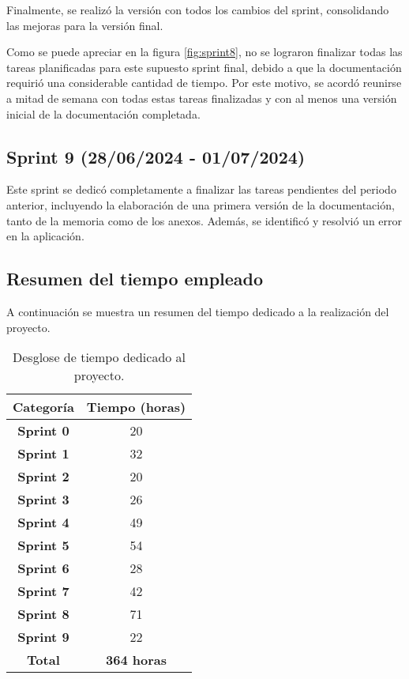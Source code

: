 Finalmente, se realizó la versión con todos los cambios del sprint, consolidando las mejoras para la versión final.


Como se puede apreciar en la figura \ref{fig:sprint8}, no se lograron finalizar todas las tareas planificadas para este supuesto sprint final, debido a que la documentación requirió una considerable cantidad de tiempo. Por este motivo, se acordó reunirse a mitad de semana con todas estas tareas finalizadas y con al menos una versión inicial de la documentación completada.

\subsection{Sprint 9 (28/06/2024 - 01/07/2024)}\label{sprint-9}

Este sprint se dedicó completamente a finalizar las tareas pendientes del periodo anterior, incluyendo la elaboración de una primera versión de la documentación, tanto de la memoria como de los anexos. Además, se identificó y resolvió un error en la aplicación.

\subsection{Resumen del tiempo empleado}\label{resumen-del-tiempo-empleado}

A continuación se muestra un resumen del tiempo dedicado a la realización del proyecto.

\begin{table}[h!]
    \centering
    \begin{tabular}{c c}
        \hline
        \textbf{Categoría}      & \textbf{Tiempo (horas)} \\
        \hline
        \textbf{Sprint 0}       & 20    \\
        \textbf{Sprint 1}       & 32    \\
        \textbf{Sprint 2}       & 20    \\
        \textbf{Sprint 3}       & 26    \\
        \textbf{Sprint 4}       & 49    \\
        \textbf{Sprint 5}       & 54    \\
        \textbf{Sprint 6}       & 28    \\
        \textbf{Sprint 7}       & 42    \\
        \textbf{Sprint 8}       & 71    \\
        \textbf{Sprint 9}       & 22    \\
        \hline
        \textbf{Total}          & \textbf{364 horas}\\
        \hline
    \end{tabular}
    \caption{Desglose de tiempo dedicado al proyecto.}\label{tabla:tiempo-dedicado-al-proyecto}
\end{table}

